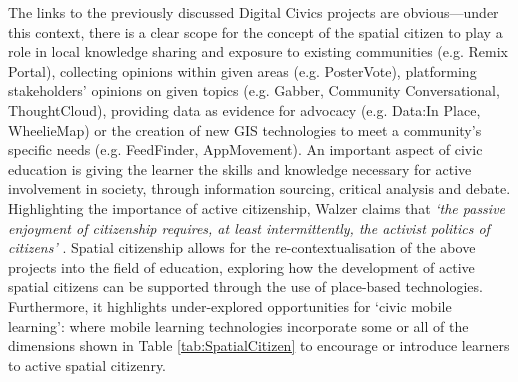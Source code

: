 The links to the previously discussed Digital Civics projects are obvious---under this context, there is a clear scope for the concept of the spatial citizen to play a role in local knowledge sharing and exposure to existing communities (e.g. Remix Portal), collecting opinions within given areas (e.g. PosterVote), platforming stakeholders' opinions on given topics (e.g. Gabber, Community Conversational, ThoughtCloud), providing data as evidence for advocacy (e.g. Data:In Place, WheelieMap) or the creation of new GIS technologies to meet a community's specific needs (e.g. FeedFinder, AppMovement). An important aspect of civic education is giving the learner the skills and knowledge necessary for active involvement in society, through information sourcing, critical analysis and debate. Highlighting the importance of active citizenship, Walzer claims that \textit{`the passive enjoyment of citizenship requires, at least intermittently, the activist politics of citizens’} \citep{Walzer1983}. Spatial citizenship allows for the re-contextualisation of the above projects into the field of education, exploring how the development of active spatial citizens can be supported through the use of place-based technologies. Furthermore, it highlights under-explored opportunities for `civic mobile learning': where mobile learning technologies incorporate some or all of the dimensions shown in Table \ref{tab:SpatialCitizen} to encourage or introduce learners to active spatial citizenry.

